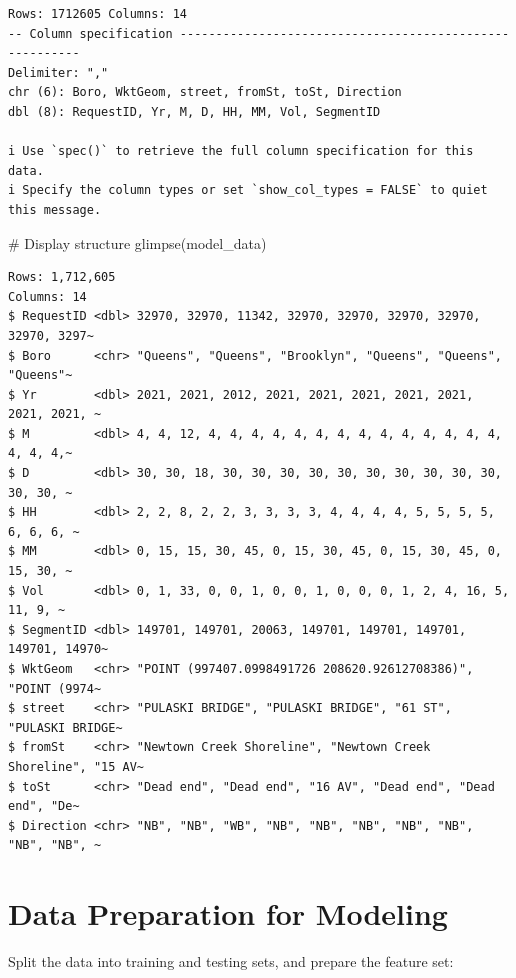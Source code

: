 \documentclass[
  letterpaper,
  DIV=11,
  numbers=noendperiod]{scrreprt}
\newenvironment{Shaded}{\begin{snugshade}}{\end{snugshade}}
\newcommand{\CommentTok}[1]{\textcolor[rgb]{0.37,0.37,0.37}{#1}}
\newcommand{\FunctionTok}[1]{\textcolor[rgb]{0.28,0.35,0.67}{#1}}
\newcommand{\NormalTok}[1]{\textcolor[rgb]{0.00,0.23,0.31}{#1}}
\begin{document}
\begin{verbatim}
Rows: 1712605 Columns: 14
-- Column specification --------------------------------------------------------
Delimiter: ","
chr (6): Boro, WktGeom, street, fromSt, toSt, Direction
dbl (8): RequestID, Yr, M, D, HH, MM, Vol, SegmentID

i Use `spec()` to retrieve the full column specification for this data.
i Specify the column types or set `show_col_types = FALSE` to quiet this message.
\end{verbatim}

\begin{Shaded}
\begin{Highlighting}[]
\CommentTok{\# Display structure}
\FunctionTok{glimpse}\NormalTok{(model\_data)}
\end{Highlighting}
\end{Shaded}

\begin{verbatim}
Rows: 1,712,605
Columns: 14
$ RequestID <dbl> 32970, 32970, 11342, 32970, 32970, 32970, 32970, 32970, 3297~
$ Boro      <chr> "Queens", "Queens", "Brooklyn", "Queens", "Queens", "Queens"~
$ Yr        <dbl> 2021, 2021, 2012, 2021, 2021, 2021, 2021, 2021, 2021, 2021, ~
$ M         <dbl> 4, 4, 12, 4, 4, 4, 4, 4, 4, 4, 4, 4, 4, 4, 4, 4, 4, 4, 4, 4,~
$ D         <dbl> 30, 30, 18, 30, 30, 30, 30, 30, 30, 30, 30, 30, 30, 30, 30, ~
$ HH        <dbl> 2, 2, 8, 2, 2, 3, 3, 3, 3, 4, 4, 4, 4, 5, 5, 5, 5, 6, 6, 6, ~
$ MM        <dbl> 0, 15, 15, 30, 45, 0, 15, 30, 45, 0, 15, 30, 45, 0, 15, 30, ~
$ Vol       <dbl> 0, 1, 33, 0, 0, 1, 0, 0, 1, 0, 0, 0, 1, 2, 4, 16, 5, 11, 9, ~
$ SegmentID <dbl> 149701, 149701, 20063, 149701, 149701, 149701, 149701, 14970~
$ WktGeom   <chr> "POINT (997407.0998491726 208620.92612708386)", "POINT (9974~
$ street    <chr> "PULASKI BRIDGE", "PULASKI BRIDGE", "61 ST", "PULASKI BRIDGE~
$ fromSt    <chr> "Newtown Creek Shoreline", "Newtown Creek Shoreline", "15 AV~
$ toSt      <chr> "Dead end", "Dead end", "16 AV", "Dead end", "Dead end", "De~
$ Direction <chr> "NB", "NB", "WB", "NB", "NB", "NB", "NB", "NB", "NB", "NB", ~
\end{verbatim}

\section{Data Preparation for
Modeling}\label{data-preparation-for-modeling}

Split the data into training and testing sets, and prepare the feature
set:
\end{document}
